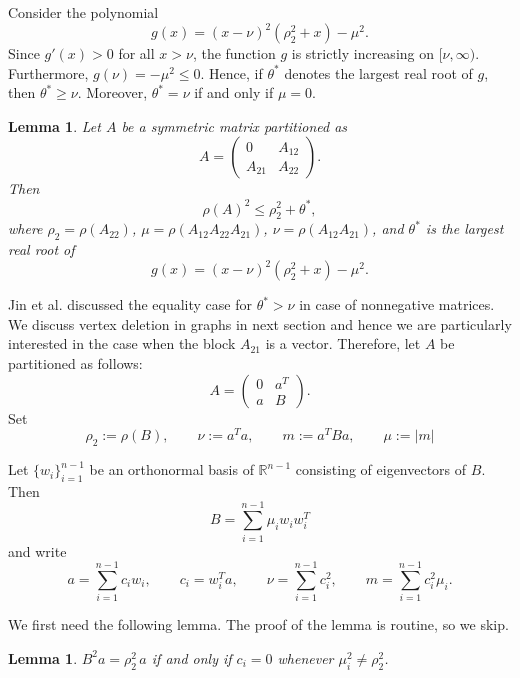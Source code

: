 \documentclass[12pt]{article}
\theoremstyle{plain}
\newtheorem{lemma}[theorem]{Lemma}
\numberwithin{equation}{section}
\begin{document}
	Consider the polynomial
	\[
	g(x)=(x-\nu)^2(\rho_2^2+x)-\mu^2.
	\]
	Since $g'(x)>0$ for all $x>\nu$, the function $g$ is strictly increasing on $[\nu,\infty)$. Furthermore, $g(\nu)=-\mu^2\le 0.$
	Hence, if $\theta^*$ denotes the largest real root of $g$, then $\theta^*\ge \nu$. Moreover, $\theta^*=\nu$ if and only if $\mu=0.$
	
	\begin{lemma}\label{Spec_Rad_Sym1}\emph{\cite{jin2024upper}}
		Let $A$ be a symmetric matrix partitioned as
		\[
		A=
		\begin{pmatrix}
			0 & A_{12}\\
			A_{21} & A_{22}
		\end{pmatrix}.
		\]
		Then
		\[
		\rho(A)^2\le \rho_2^2+\theta^*,
		\]
		where $\rho_2=\rho(A_{22})$, $\mu=\rho(A_{12}A_{22}A_{21})$, $\nu=\rho(A_{12}A_{21})$, and $\theta^*$ is the largest real root of
		\[
		g(x)=(x-\nu)^2(\rho_2^2+x)-\mu^2.
		\]
	\end{lemma}
	Jin et al. \cite{jin2024upper} discussed the equality case for $\theta^* > \nu$ in case of nonnegative matrices. We discuss vertex deletion in graphs in next section and hence we are particularly interested in the case when the block $A_{21}$ is a vector. Therefore, let $A$ be partitioned as follows:
	\[
	A=
	\begin{pmatrix}
		0 & a^T\\
		a & B
	\end{pmatrix}.
	\]
	Set
	\[
	\rho_{2}:=\rho(B),\qquad
	\nu:=a^{T}a,\qquad
	m:=a^{T}Ba,\qquad
	\mu:=|m|
	\]
	
	Let $\{w_i\}_{i=1}^{n-1}$ be an orthonormal basis of $\mathbb{R}^{n-1}$ consisting of eigenvectors of $B$. Then
	\[
	B=\sum_{i=1}^{n-1} \mu_i w_iw_i^T
	\]
	and write
	\[
	a=\sum_{i=1}^{n-1} c_iw_i,\qquad
	c_i=w_i^Ta,\qquad
	\nu=\sum_{i=1}^{n-1} c_i^2,\qquad
	m=\sum_{i=1}^{n-1} c_i^2\mu_i.
	\]
	
	
	We first need the following lemma. The proof of the lemma is routine, so we skip.
	
	\begin{lemma}\label{equivalence}
		$B^2a=\rho_2^2\,a$ if and only if $c_i = 0$ whenever $\mu_i^2\ne\rho_2^2$.
	\end{lemma}
		
		
\end{document}
